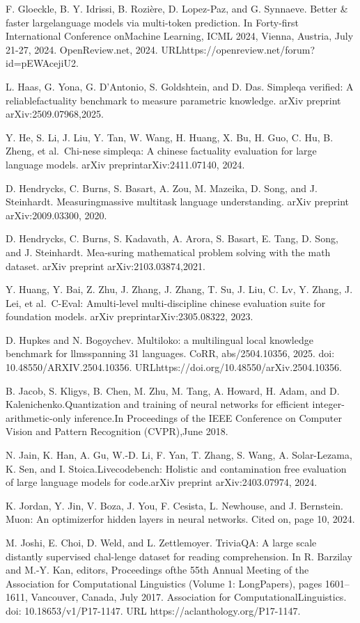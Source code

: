 \documentclass[
  10
]{article}
\begin{document}
F. Gloeckle, B. Y. Idrissi, B. Rozière, D. Lopez-Paz, and G. Synnaeve.
Better \& faster largelanguage models via multi-token prediction. In
Forty-first International Conference onMachine Learning, ICML 2024,
Vienna, Austria, July 21-27, 2024. OpenReview.net, 2024.
URLhttps://openreview.net/forum?id=pEWAcejiU2.

L. Haas, G. Yona, G. D'Antonio, S. Goldshtein, and D. Das. Simpleqa
verified: A reliablefactuality benchmark to measure parametric
knowledge. arXiv preprint arXiv:2509.07968,2025.

Y. He, S. Li, J. Liu, Y. Tan, W. Wang, H. Huang, X. Bu, H. Guo, C. Hu,
B. Zheng, et al.~Chi-nese simpleqa: A chinese factuality evaluation for
large language models. arXiv preprintarXiv:2411.07140, 2024.

D. Hendrycks, C. Burns, S. Basart, A. Zou, M. Mazeika, D. Song, and J.
Steinhardt. Measuringmassive multitask language understanding. arXiv
preprint arXiv:2009.03300, 2020.

D. Hendrycks, C. Burns, S. Kadavath, A. Arora, S. Basart, E. Tang, D.
Song, and J. Steinhardt. Mea-suring mathematical problem solving with
the math dataset. arXiv preprint arXiv:2103.03874,2021.

Y. Huang, Y. Bai, Z. Zhu, J. Zhang, J. Zhang, T. Su, J. Liu, C. Lv, Y.
Zhang, J. Lei, et al.~C-Eval: Amulti-level multi-discipline chinese
evaluation suite for foundation models. arXiv preprintarXiv:2305.08322,
2023.

D. Hupkes and N. Bogoychev. Multiloko: a multilingual local knowledge
benchmark for llmsspanning 31 languages. CoRR, abs/2504.10356, 2025.
doi: 10.48550/ARXIV.2504.10356.
URLhttps://doi.org/10.48550/arXiv.2504.10356.

B. Jacob, S. Kligys, B. Chen, M. Zhu, M. Tang, A. Howard, H. Adam, and
D. Kalenichenko.Quantization and training of neural networks for
efficient integer-arithmetic-only inference.In Proceedings of the IEEE
Conference on Computer Vision and Pattern Recognition (CVPR),June 2018.

N. Jain, K. Han, A. Gu, W.-D. Li, F. Yan, T. Zhang, S. Wang, A.
Solar-Lezama, K. Sen, and I. Stoica.Livecodebench: Holistic and
contamination free evaluation of large language models for code.arXiv
preprint arXiv:2403.07974, 2024.

K. Jordan, Y. Jin, V. Boza, J. You, F. Cesista, L. Newhouse, and J.
Bernstein. Muon: An optimizerfor hidden layers in neural networks. Cited
on, page 10, 2024.

M. Joshi, E. Choi, D. Weld, and L. Zettlemoyer. TriviaQA: A large scale
distantly supervised chal-lenge dataset for reading comprehension. In R.
Barzilay and M.-Y. Kan, editors, Proceedings ofthe 55th Annual Meeting
of the Association for Computational Linguistics (Volume 1: LongPapers),
pages 1601--1611, Vancouver, Canada, July 2017. Association for
ComputationalLinguistics. doi: 10.18653/v1/P17-1147. URL
https://aclanthology.org/P17-1147.
\end{document}
